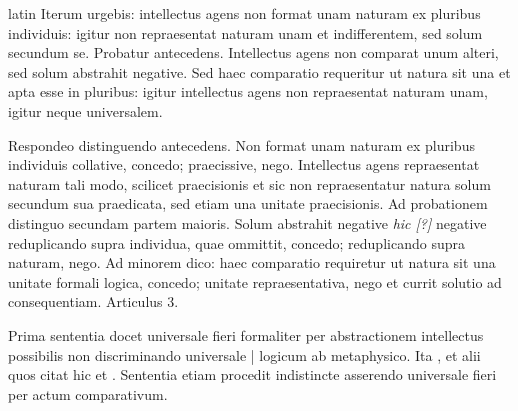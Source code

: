 \begin{otherlanguage*}{latin}
\pstart
  Iterum urgebis: intellectus agens non format unam naturam ex pluribus individuis: igitur non repraesentat naturam unam et indifferentem, sed solum secundum se. Probatur antecedens. Intellectus agens non comparat unum alteri, sed solum abstrahit negative. Sed haec comparatio requeritur ut natura sit una et apta esse in pluribus: igitur intellectus agens non repraesentat naturam unam, igitur neque universalem. 
\pend

\pstart
  Respondeo distinguendo antecedens. Non format unam naturam ex pluribus individuis collative, concedo; praecissive, nego. Intellectus agens repraesentat naturam tali modo, scilicet praecisionis et sic non repraesentatur natura solum secundum sua praedicata, sed etiam una unitate praecisionis. Ad probationem distinguo secundam partem maioris. Solum abstrahit negative \emph{hic [?]} negative reduplicando supra individua, quae ommittit, concedo; reduplicando supra naturam, nego. Ad minorem dico: haec comparatio requiretur ut natura sit una unitate formali logica, concedo; unitate repraesentativa, nego et currit solutio ad consequentiam. Articulus 3. 
\pend

        \pstart
        \pend
      
\pstart
  Prima sententia docet universale fieri formaliter per abstractionem intellectus possibilis non discriminando universale \textnormal{|} logicum ab metaphysico. Ita ,   et alii quos citat   hic  et  .  Sententia etiam procedit indistincte asserendo universale fieri per actum comparativum. 
\pend


\end{otherlanguage*}
